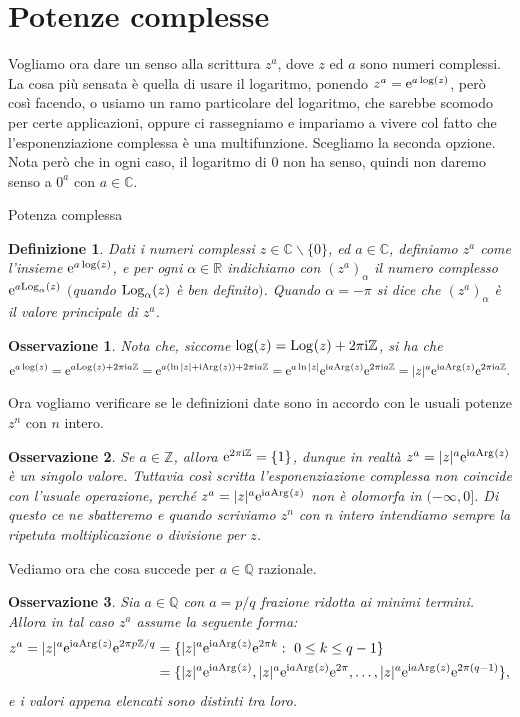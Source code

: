 \documentclass[11pt]{book}
\theoremstyle{Definizione}
\newtheorem*{mydef}{Definizione}
\theoremstyle{TeoremaProposizioneLemmaCorollarioCongettura}
\theoremstyle{OsservazioneNotaEsempio}
\newtheorem{myobs}{Osservazione}[section]
\newcommand{\R}{\mathbb{R}}
\newcommand{\Z}{\mathbb{Z}}
\newcommand{\Q}{\mathbb{Q}}
\newcommand{\C}{\mathbb{C}}
\newcommand{\tolto}{\smallsetminus}
\newcommand{\Arg}[1][]{\textup{Arg}_{#1}}
\renewcommand{\i}{\textup{i}}
\newcommand{\e}{\textup{e}}
\newcommand{\Log}[1][]{\textup{Log}_{#1}}
\begin{document}
\section{Potenze complesse}
Vogliamo ora dare un senso alla scrittura $z^a$, dove $z$ ed $a$ sono numeri complessi. La cosa più sensata è quella di usare il logaritmo, ponendo $z^a = \e^{a \log(z)}$, però così facendo, o usiamo un ramo particolare del logaritmo, che sarebbe scomodo per certe applicazioni, oppure ci rassegniamo e impariamo a vivere col fatto che l'esponenziazione complessa è una multifunzione. Scegliamo la seconda opzione. Nota però che in ogni caso, il logaritmo di $0$ non ha senso, quindi non daremo senso a $0^a$ con $a\in \C$.
\begin{boxdef}{Potenza complessa}
\begin{mydef}
Dati i numeri complessi $z\in \C \tolto \{0\}$, ed $a\in \C$, definiamo $z^a$ come l'insieme $\e^{a\log(z)}$, e per ogni $\alpha\in \R$ indichiamo con $(z^a)_\alpha$ il numero complesso $\e^{a \Log[\alpha](z)}$ $($quando $\Log[\alpha](z)$ è ben definito$)$. Quando $\alpha = -\pi$ si dice che $(z^a)_\alpha$ è il valore principale di $z^a$.
\end{mydef}
\end{boxdef}
\begin{myobs}
Nota che, siccome $\log(z) = \Log(z)+2\pi\i\Z$, si ha che
$$
\e^{a \log(z)} = \e^{a \Log(z)+2\pi\i a \Z} = \e^{a(\ln|z| + \i\Arg(z)) + 2\pi\i a \Z} = \e^{a\ln|z|}\e^{\i a\Arg(z)} \e^{2\pi\i a \Z} = |z|^a \e^{\i a \Arg(z)} \e^{2\pi\i a \Z}.
$$
\end{myobs}
Ora vogliamo verificare se le definizioni date sono in accordo con le usuali potenze $z^n$ con $n$ intero.
\begin{myobs}
Se $a\in \Z$, allora $\e^{2\pi\i \Z} = \{1\}$, dunque in realtà $z^a = |z|^a \e^{\i a \Arg(z)}$ è un singolo valore. Tuttavia così scritta l'esponenziazione complessa non coincide con l'usuale operazione, perché $z^a = |z|^a \e^{\i a \Arg(z)}$ non è olomorfa in $(-\infty,0]$. Di questo ce ne sbatteremo e quando scriviamo $z^n$ con $n$ intero intendiamo sempre la ripetuta moltiplicazione o divisione per $z$.
\end{myobs}
Vediamo ora che cosa succede per $a\in \Q$ razionale.
\begin{myobs}
Sia $a \in \Q$ con $a = p/q$ frazione ridotta ai minimi termini. Allora in tal caso $z^a$ assume la seguente forma:
\begin{align*}
z^a = |z|^a \e^{\i a \Arg(z)} \e^{2\pi p\Z/q} &= \{|z|^a\e^{\i a \Arg(z)} \e^{2\pi k}:\ 0\leq k \leq q-1\}\\
    &= \{|z|^{a}\e^{\i a \Arg(z)}, |z|^a \e^{\i a \Arg(z)}\e^{2\pi}, \dots, |z|^{a} \e^{\i a \Arg(z)}\e^{2\pi (q-1)}\},
\end{align*}
e i valori appena elencati sono distinti tra loro.
\end{myobs}
\end{document}
